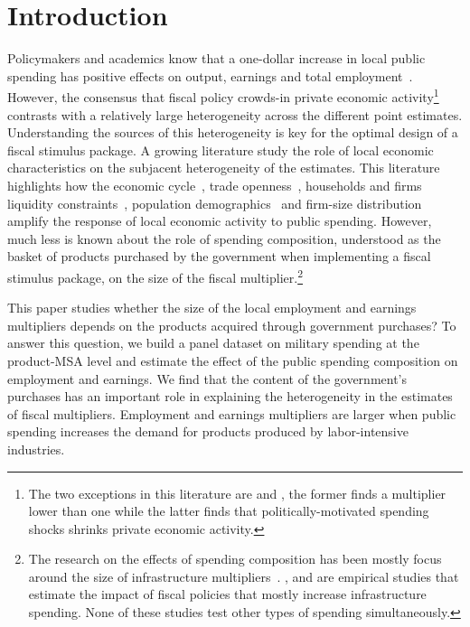 \documentclass[dv_diss_main.tex]{subfiles}
\begin{document}
\section{Introduction}
\label{sec:into}


Policymakers and academics know that a one-dollar increase in local public spending has positive effects on output, earnings and total employment~\cite{chodorow2019geographic}. However, the consensus that fiscal policy crowds-in private economic activity\footnote{The two exceptions in this literature are \cite{Dupor2017} and \cite{cohen2011powerful}, the former finds a multiplier lower than one while the latter finds that politically-motivated spending shocks shrinks private economic activity.}
contrasts with a relatively large heterogeneity across the different point estimates. Understanding the sources of this heterogeneity is key for the optimal design of a fiscal stimulus package. A growing literature study the role of local economic characteristics on the subjacent heterogeneity of the estimates. This literature highlights how the economic cycle~\citep{cohen2011powerful, serrato2016estimating,buchheim2020job}, trade openness~\citep{corbi2019regional}, households and firms liquidity constraints~\citep{Demyanyk2019,auerbach2020effects, bruckner2014local}, population demographics~\citep{basso2021young} and firm-size distribution \citep{Juarros2021} amplify the response of local economic activity to public spending. However, much less is known about the role of spending composition, understood as the basket of products purchased by the government when implementing a fiscal stimulus package, on the size of the fiscal multiplier.\footnote{The research on the effects of spending composition has been mostly focus around the size of infrastructure multipliers~\citep{Boehm2020,ramey2020macroeconomic}. \cite{garin2019putting}, \cite{buchheim2017employment} and \cite{Valderrama} are empirical studies that estimate the impact of fiscal policies that mostly increase infrastructure spending. None of these studies test other types of spending simultaneously.} 


This paper studies whether the size of the local employment and earnings multipliers depends on the products acquired through government purchases? To answer this question, we build a panel dataset on military spending at the product-MSA level and estimate the effect of the public spending composition on employment and earnings. We find that the content of the government's purchases has an important role in explaining the heterogeneity in the estimates of fiscal multipliers. Employment and earnings multipliers are larger when public spending increases the demand for products produced by labor-intensive industries. 
 
\end{document}
